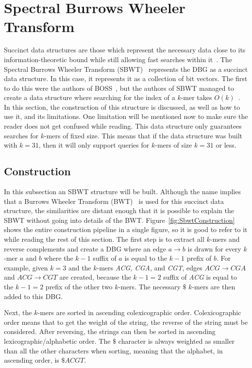 \section{Spectral Burrows Wheeler Transform}\label{sec:SBWT}

Succinct data structures are those which represent the necessary data close to its information-theoretic bound while still allowing fast searches within it~\cite{Succinct}.
The Spectral Burrows Wheeler Transform (SBWT)~\cite{SBWT} represents the DBG as a succinct data structure.
In this case, it represents it as a collection of bit vectors.
The first to do this were the authors of BOSS~\cite{SuccinctDeBruijnGraphs}, but the authors of SBWT managed to create a data structure where searching for the index of a $k$-mer takes $O(k)$~\cite{SBWT}.
In this section, the construction of this structure is discussed, as well as how to use it, and its limitations.
One limitation will be mentioned now to make sure the reader does not get confused while reading.
This data structure only guarantees searches for $k$-mers of fixed size.
This means that if the data structure was built with $k=31$, then it will only support queries for $k$-mers of size $k=31$ or less.

\subsection{Construction}

In this subsection an SBWT structure will be built.
Although the name implies that a Burrows Wheeler Transform (BWT)~\cite{BWT} is used for this succinct data structure, the similarities are distant enough that it is possible to explain the SBWT without going into details of the BWT.\@
Figure~\ref{fig:SbwtConstruction} shows the entire construction pipeline in a single figure, so it is good to refer to it while reading the rest of this section.
The first step is to extract all $k$-mers and reverse complements and create a DBG where an edge $a \rightarrow b$ is drawn for every $k$-mer $a$ and $b$ where the $k-1$ suffix of $a$ is equal to the $k-1$ prefix of $b$.
For example, given $k=3$ and the $k$-mers \textit{ACG, CGA}, and \textit{CGT}, edges $ACG \rightarrow CGA$ and $ACG \rightarrow CGT$ are created, because the $k-1=2$ suffix of \textit{ACG} is equal to the $k-1=2$ prefix of the other two $k$-mers.
The necessary $\$$ $k$-mers are then added to this DBG.\@

Next, the $k$-mers are sorted in ascending colexicographic order.
Colexicographic order means that to get the weight of the string, the reverse of the string must be considered.
After reversing, the  strings can then be sorted in ascending lexicographic/alphabetic order.
The $\$$ character is always weighted as smaller than all the other characters when sorting, meaning that the alphabet, in ascending order, is $\$ACGT$.

